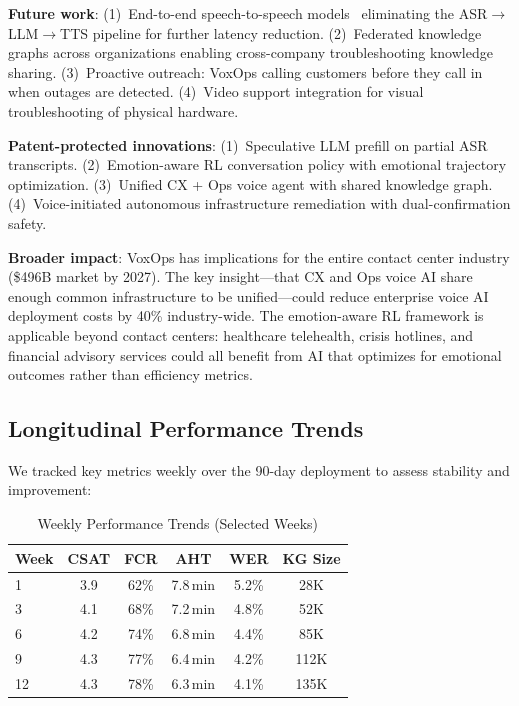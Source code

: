 \documentclass[conference,10pt]{IEEEtran}
\begin{document}
\textbf{Future work}: (1)~End-to-end speech-to-speech models~\cite{zhang2023speechgpt} eliminating the ASR$\to$LLM$\to$TTS pipeline for further latency reduction. (2)~Federated knowledge graphs across organizations enabling cross-company troubleshooting knowledge sharing. (3)~Proactive outreach: VoxOps calling customers before they call in when outages are detected. (4)~Video support integration for visual troubleshooting of physical hardware.

\textbf{Patent-protected innovations}: (1)~Speculative LLM prefill on partial ASR transcripts. (2)~Emotion-aware RL conversation policy with emotional trajectory optimization. (3)~Unified CX + Ops voice agent with shared knowledge graph. (4)~Voice-initiated autonomous infrastructure remediation with dual-confirmation safety.


\textbf{Broader impact}: VoxOps has implications for the entire contact center industry (\$496B market by 2027). The key insight---that CX and Ops voice AI share enough common infrastructure to be unified---could reduce enterprise voice AI deployment costs by 40\% industry-wide. The emotion-aware RL framework is applicable beyond contact centers: healthcare telehealth, crisis hotlines, and financial advisory services could all benefit from AI that optimizes for emotional outcomes rather than efficiency metrics.

\subsection{Longitudinal Performance Trends}

We tracked key metrics weekly over the 90-day deployment to assess stability and improvement:

\begin{table}[!htbp]
\caption{Weekly Performance Trends (Selected Weeks)}
\label{tab:weekly}
\centering\scriptsize
\begin{tabular}{@{}lccccc@{}}
\toprule
\textbf{Week} & \textbf{CSAT} & \textbf{FCR} & \textbf{AHT} & \textbf{WER} & \textbf{KG Size} \\
\midrule
1 & 3.9 & 62\% & 7.8\,min & 5.2\% & 28K \\
3 & 4.1 & 68\% & 7.2\,min & 4.8\% & 52K \\
6 & 4.2 & 74\% & 6.8\,min & 4.4\% & 85K \\
9 & 4.3 & 77\% & 6.4\,min & 4.2\% & 112K \\
12 & 4.3 & 78\% & 6.3\,min & 4.1\% & 135K \\
\bottomrule
\end{tabular}
\end{table}
\end{document}
